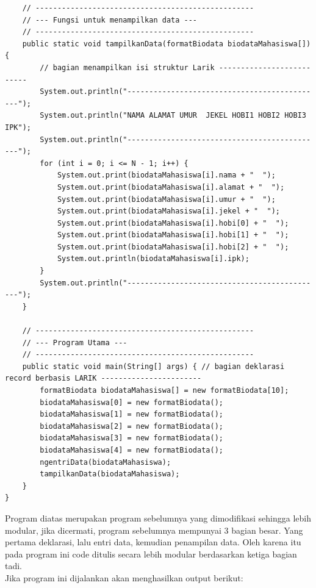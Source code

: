 \documentclass[a4paper,12pt]{article}
\begin{document}
\begin{lstlisting}
    // --------------------------------------------------
    // --- Fungsi untuk menampilkan data ---
    // --------------------------------------------------
    public static void tampilkanData(formatBiodata biodataMahasiswa[]) {
        // bagian menampilkan isi struktur Larik --------------------------
        System.out.println("---------------------------------------------");
        System.out.println("NAMA ALAMAT UMUR  JEKEL HOBI1 HOBI2 HOBI3 IPK");
        System.out.println("---------------------------------------------");
        for (int i = 0; i <= N - 1; i++) {
            System.out.print(biodataMahasiswa[i].nama + "  ");
            System.out.print(biodataMahasiswa[i].alamat + "  ");
            System.out.print(biodataMahasiswa[i].umur + "  ");
            System.out.print(biodataMahasiswa[i].jekel + "  ");
            System.out.print(biodataMahasiswa[i].hobi[0] + "  ");
            System.out.print(biodataMahasiswa[i].hobi[1] + "  ");
            System.out.print(biodataMahasiswa[i].hobi[2] + "  ");
            System.out.println(biodataMahasiswa[i].ipk);
        }
        System.out.println("---------------------------------------------");
    }

    // --------------------------------------------------
    // --- Program Utama ---
    // --------------------------------------------------
    public static void main(String[] args) { // bagian deklarasi record berbasis LARIK -----------------------
        formatBiodata biodataMahasiswa[] = new formatBiodata[10];
        biodataMahasiswa[0] = new formatBiodata();
        biodataMahasiswa[1] = new formatBiodata();
        biodataMahasiswa[2] = new formatBiodata();
        biodataMahasiswa[3] = new formatBiodata();
        biodataMahasiswa[4] = new formatBiodata();
        ngentriData(biodataMahasiswa);
        tampilkanData(biodataMahasiswa);
    }
}
\end{lstlisting}
Program diatas merupakan program sebelumnya yang dimodifikasi sehingga lebih modular, jika dicermati, program
sebelumnya mempunyai 3 bagian besar. Yang pertama deklarasi, lalu entri data, kemudian penampilan data. Oleh karena itu
pada program ini code ditulis secara lebih modular berdasarkan ketiga bagian tadi.\\
Jika program ini dijalankan akan menghasilkan output berikut:\\
\end{document}
